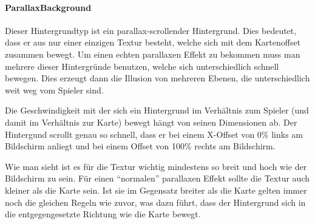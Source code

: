 \paragraph{ParallaxBackground}

Dieser Hintergrundtyp ist ein parallax-scrollender Hintergrund. Dies bedeutet, dass er aus nur einer einzigen Textur besteht, welche sich mit dem Kartenoffset zusammen bewegt. Um einen echten parallaxen Effekt zu bekommen muss man mehrere dieser Hintergründe benutzen, welche sich unterschiedlich schnell bewegen. Dies erzeugt dann die Illusion von mehreren Ebenen, die unterschiedlich weit weg vom Spieler sind.

Die Geschwindigkeit mit der sich ein Hintergrund im Verhältnis zum Spieler (und damit im Verhältnis zur Karte) bewegt hängt von seinen Dimensionen ab. Der Hintergund scrollt genau so schnell, dass er bei einem X-Offset von 0\% links am Bildschirm anliegt und bei einem Offset von 100\% rechts am Bildschirm.


Wie man sieht ist es für die Textur wichtig mindestens so breit und hoch wie der Bildschirm zu sein. Für einen ``normalen'' parallaxen Effekt sollte die Textur auch kleiner als die Karte sein. Ist sie im Gegensatz breiter  als die Karte gelten immer noch die gleichen Regeln wie zuvor, was dazu führt, dass der Hintergrund sich in die entgegengesetzte Richtung wie die Karte bewegt.

